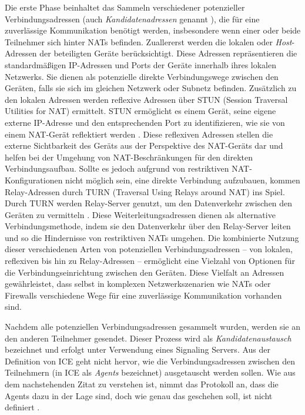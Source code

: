 Die erste Phase beinhaltet das Sammeln verschiedener potenzieller Verbindungsadressen (auch \textit{Kandidatenadressen} genannt \parencite[S. 8]{rfc8445_ICE}), die für eine zuverlässige Kommunikation benötigt werden, insbesondere wenn einer oder beide Teilnehmer sich hinter NATs befinden. Zuallererst werden die lokalen oder \textit{Host}-Adressen der beteiligten Geräte berücksichtigt. Diese Adressen repräsentieren die standardmäßigen IP-Adressen und Ports der Geräte innerhalb ihres lokalen Netzwerks. Sie dienen als potenzielle direkte Verbindungswege zwischen den Geräten, falls sie sich im gleichen Netzwerk oder Subnetz befinden.
Zusätzlich zu den lokalen Adressen werden reflexive Adressen über STUN (Session Traversal Utilities for NAT) ermittelt. STUN ermöglicht es einem Gerät, seine eigene externe IP-Adresse und den entsprechenden Port zu identifizieren, wie sie von einem NAT-Gerät reflektiert werden \parencite[S. 4]{rfc8489_STUN}. Diese reflexiven Adressen stellen die externe Sichtbarkeit des Geräts aus der Perspektive des NAT-Geräts dar und helfen bei der Umgehung von NAT-Beschränkungen für den direkten Verbindungsaufbau. Sollte es jedoch aufgrund von restriktiven NAT-Konfigurationen nicht möglich sein, eine direkte Verbindung aufzubauen, kommen Relay-Adressen durch TURN (Traversal Using Relays around NAT) ins Spiel.
Durch TURN werden Relay-Server genutzt, um den Datenverkehr zwischen den Geräten zu vermitteln \parencite[S. 10 f.]{rfc8656_TURN}. Diese Weiterleitungsadressen dienen als alternative Verbindungsmethode, indem sie den Datenverkehr über den Relay-Server leiten und so die Hindernisse von restriktiven NATs umgehen.
Die kombinierte Nutzung dieser verschiedenen Arten von potenziellen Verbindungsadressen – von lokalen, reflexiven bis hin zu Relay-Adressen – ermöglicht eine Vielzahl von Optionen für die Verbindungseinrichtung zwischen den Geräten. Diese Vielfalt an Adressen gewährleistet, dass selbst in komplexen Netzwerkszenarien wie NATs oder Firewalls verschiedene Wege für eine zuverlässige Kommunikation vorhanden sind.

Nachdem alle potenziellen Verbindungsadressen gesammelt wurden, werden sie an den anderen Teilnehmer gesendet. Dieser Prozess wird als \textit{Kandidatenaustausch} bezeichnet und erfolgt unter Verwendung eines Signaling Servers. Aus der Definition von ICE geht nicht hervor, wie die Verbindungsadressen zwischen den Teilnehmern (in ICE als \textit{Agents} bezeichnet) ausgetauscht werden sollen. Wie aus dem nachstehenden Zitat zu verstehen ist, nimmt das Protokoll an, dass die Agents dazu in der Lage sind, doch wie genau das geschehen soll, ist nicht definiert \Parencite[S. 7 ff.]{rfc8445_ICE}.

